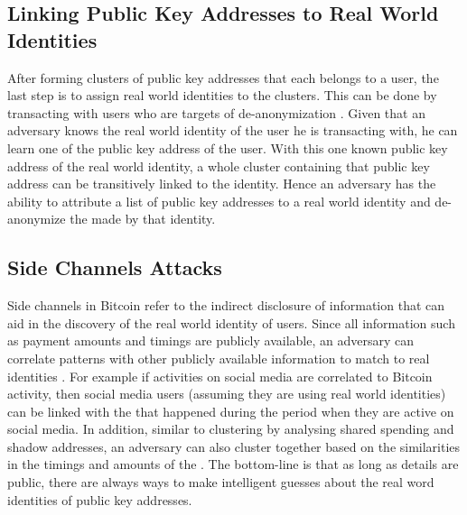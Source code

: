 \subsection{Linking Public Key Addresses to Real World Identities}
\label{sec:1-Linking Public Key Addresses to Real World Identities}
After forming clusters of public key addresses that each belongs to a user, the last step is to assign real world identities to the clusters. This can be done by transacting with users who are targets of de-anonymization \cite{Meiklejohn2013}. Given that an adversary knows the real world identity of the user he is transacting with, he can learn one of the public key address of the user. With this one known public key address of the real world identity, a whole cluster containing that public key address can be transitively linked to the identity. Hence an adversary has the ability to attribute a list of public key addresses to a real world identity and de-anonymize the  made by that identity.

\subsection{Side Channels Attacks}
\label{sec:1-Side Channels Attacks}
Side channels in Bitcoin refer to the indirect disclosure of information that can aid in the discovery of the real world identity of users. Since all \kwTransaction{}{} information such as payment amounts and timings are publicly available, an adversary can correlate  patterns with other publicly available information to match  to real identities \cite{narayanan2016bitcoin}. For example if activities on social media are correlated to Bitcoin  activity, then social media users (assuming they are using real world identities) can be linked with the  that happened during the period when they are active on social media. In addition, similar to clustering  by analysing shared spending and shadow addresses, an adversary can also cluster  together based on the similarities in the timings and amounts of the  \cite{Androulaki2013}. The bottom-line is that as long as \kwTransaction{}{} details are public, there are always ways to make intelligent guesses about the real word identities of public key addresses.   
